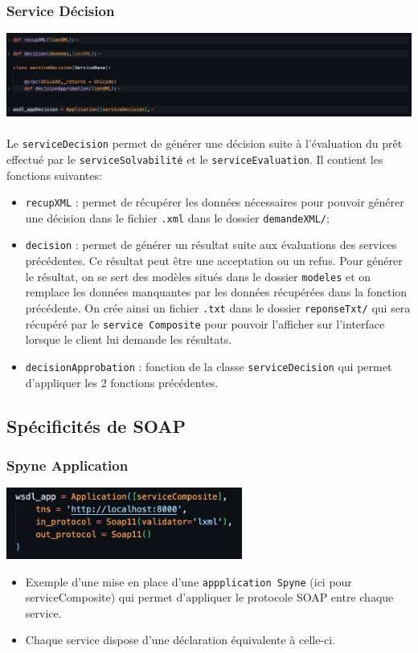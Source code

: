 \documentclass{article}
\begin{document}
    \subsubsection{Service Décision}
      \includegraphics[width=\textwidth]{Images/7.2/serviceDecision.png}\\
    \\
    Le \texttt{serviceDecision} permet de générer une décision suite à l'évaluation du prêt effectué par le \texttt{serviceSolvabilité} et le \texttt{serviceEvaluation}. Il contient les fonctions suivantes:
    \begin{itemize}
        \item \texttt{recupXML} : permet de récupérer les données nécessaires pour pouvoir générer une décision dans le fichier \texttt{.xml} dans le dossier \texttt{demandeXML/};
        \item \texttt{decision} : permet de générer un résultat suite aux évaluations des services précédentes. Ce résultat peut être une acceptation ou un refus. Pour générer le résultat, on se sert des modèles situés dans le dossier \texttt{modeles} et on remplace les données manquantes par les données récupérées dans la fonction précédente. On crée ainsi un fichier \texttt{.txt} dans le dossier \texttt{reponseTxt/} qui sera récupéré par le \texttt{service Composite} pour pouvoir l'afficher sur l'interface lorsque le client lui demande les résultats.
        \item \texttt{decisionApprobation} : fonction de la classe \texttt{serviceDecision} qui permet d'appliquer les 2 fonctions précédentes.
    \end{itemize}
	\subsection{Spécificités de SOAP}
      \subsubsection{Spyne Application} 
        \begin{center}
          \includegraphics[width=220pt]{Images/7.3/wsdlApp.png}\\
        \end{center}
        \begin{itemize}
            \item Exemple d'une mise en place d'une \texttt{appplication Spyne} (ici pour serviceComposite) qui permet d'appliquer le protocole SOAP entre chaque service.
            \item Chaque service dispose d'une déclaration équivalente à celle-ci. 
        \end{itemize}
\end{document}
